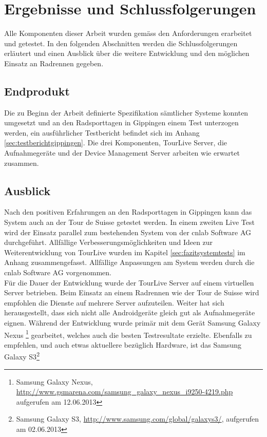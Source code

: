 \chapter{Ergebnisse und Schlussfolgerungen}

Alle Komponenten dieser Arbeit wurden gemäss den Anforderungen erarbeitet und getestet. In den folgenden Abschnitten werden die Schlussfolgerungen erläutert und einen Ausblick über die weitere Entwicklung und den möglichen Einsatz an Radrennen gegeben.

\section{Endprodukt}
Die zu Beginn der Arbeit definierte Spezifikation sämtlicher Systeme konnten umgesetzt  und an den Radsporttagen in Gippingen einem Test unterzogen werden, ein ausführlicher Testbericht befindet sich im Anhang \ref{sec:testberichtgippingen}. Die drei Komponenten, TourLive Server, die Aufnahmegeräte und der Device Management Server arbeiten wie erwartet zusammen.
\\

\section{Ausblick}
Nach den positiven Erfahrungen an den Radsporttagen in Gippingen kann das System auch an der Tour de Suisse getestet werden. In einem zweiten Live Test wird der Einsatz parallel zum bestehenden System von der cnlab Software AG durchgeführt. Allfällige Verbesserungsmöglichkeiten und Ideen zur Weiterentwicklung von TourLive wurden im Kapitel \ref{sec:fazitsystemtests} im Anhang zusammengefasst. Allfällige Anpassungen am System werden durch die cnlab Software AG vorgenommen.
\\

Für die Dauer der Entwicklung wurde der TourLive Server auf einem virtuellen Server betrieben. Beim Einsatz an einem Radrennen wie der Tour de Suisse wird empfohlen die Dienste auf mehrere Server aufzuteilen. Weiter hat sich herausgestellt, dass sich nicht alle Androidgeräte gleich gut als Aufnahmegeräte eignen. Während der Entwicklung wurde primär mit dem Gerät Samsung Galaxy Nexus \footnote{Samsung Galaxy Nexus, \url{http://www.gsmarena.com/samsung_galaxy_nexus_i9250-4219.php} aufgerufen am 12.06.2013} gearbeitet, welches auch die besten Testresultate erzielte. Ebenfalls zu empfehlen, und auch etwas aktuellere bezüglich Hardware, ist das Samsung Galaxy S3\footnote{Samsung Galaxy S3, \url{http://www.samsung.com/global/galaxys3/}, aufgerufen am 02.06.2013}
